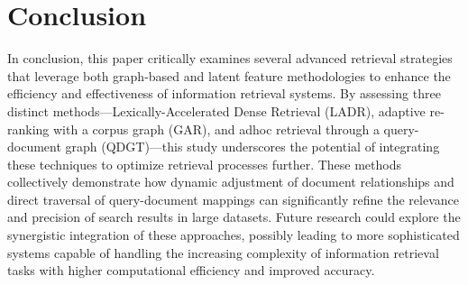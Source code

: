 \documentclass[sigconf,authorversion,nonacm]{acmart}
\begin{document}
\section{Conclusion}

In conclusion, this paper critically examines several advanced retrieval strategies that leverage
both graph-based and latent feature methodologies to enhance the efficiency and effectiveness of
information retrieval systems. By assessing three distinct methods—Lexically-Accelerated Dense
Retrieval (LADR), adaptive re-ranking with a corpus graph (GAR), and adhoc retrieval through a
query-document graph (QDGT)—this study underscores the potential of integrating these techniques to
optimize retrieval processes further. These methods collectively demonstrate how dynamic adjustment
of document relationships and direct traversal of query-document mappings can significantly refine
the relevance and precision of search results in large datasets. Future research could explore the
synergistic integration of these approaches, possibly leading to more sophisticated systems capable
of handling the increasing complexity of information retrieval tasks with higher computational
efficiency and improved accuracy.

\section*{}


\end{document}
